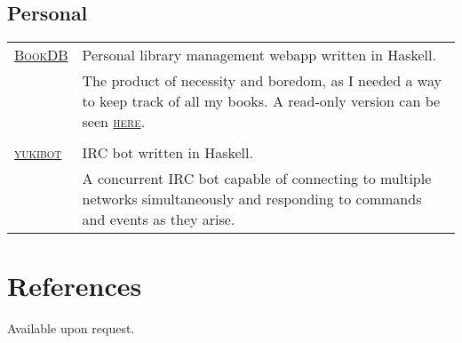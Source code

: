 \documentclass[a4paper,10pt]{article}
\newcommand{\schref}[2]{\href{#1}{\textsc{#2}}}
\newenvironment{cvtable}{\begin{tabular}{x{2cm}|p{11.6cm}}}{\end{tabular}}
\newcommand{\heading}[1]{\textsc{#1} &}
\newcommand{\detail}[1]{ & \footnotesize{#1}}
\begin{document}
\subsection{Personal}
\begin{cvtable}
  \heading{\schref{https://github.com/barrucadu/bookdb}{BookDB}}
  Personal library management webapp written in Haskell.\\
  \detail{The product of necessity and boredom, as I needed a way to
    keep track of all my books. A read-only version can be seen
    \schref{http://www.barrucadu.co.uk/bookdb/}{here}.}\\\\


  \heading{\schref{https://github.com/barrucadu/yukibot}{yukibot}}
  IRC bot written in Haskell.\\
  \detail{A concurrent IRC bot capable of connecting to multiple
    networks simultaneously and responding to commands and events as
    they arise.}
\end{cvtable}

\section{References}
Available upon request.
\end{document}
